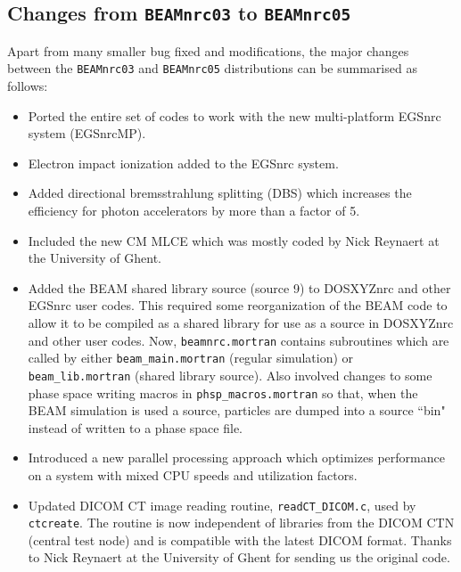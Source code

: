 \documentclass[12pt,twoside]{article}
\begin{document}
\subsection{Changes from {\tt BEAMnrc03} to {\tt BEAMnrc05}}

Apart from many smaller bug fixed and modifications,
the major changes between the {\tt BEAMnrc03} and {\tt BEAMnrc05}
distributions can be summarised as follows:

\begin{itemize}

\item Ported the entire set of codes to work with the new multi-platform
EGSnrc system (EGSnrcMP).

\item Electron impact ionization added to the EGSnrc system.

\item Added directional bremsstrahlung splitting (DBS) which increases the
efficiency for photon accelerators by more than a factor of 5.

\item Included the new CM MLCE which was mostly coded by Nick Reynaert at the
University of Ghent.

\item Added the BEAM shared library source (source 9) to DOSXYZnrc and
other EGSnrc user codes.  This required some reorganization of the
BEAM code to allow it to be compiled as a shared
library for use as a source in DOSXYZnrc and other user codes.  Now,
{\tt beamnrc.mortran} contains subroutines which are called by
either {\tt beam\_main.mortran} (regular simulation) or
{\tt beam\_lib.mortran} (shared library source).  Also involved changes
to some phase space writing macros in {\tt phsp\_macros.mortran} so
that, when the BEAM simulation is used a source, particles are dumped
into a source ``bin" instead of written to a phase space file.

\item Introduced a new parallel processing approach which optimizes
performance on a system with mixed CPU speeds and utilization factors.

\item Updated DICOM CT image reading routine, {\tt readCT\_DICOM.c}, used by
{\tt ctcreate}.  The routine is now independent of libraries from
the DICOM CTN (central test node) and is compatible with the latest
DICOM format.  Thanks to Nick Reynaert at the
University of Ghent for sending us the original
code.


\end{itemize}
\end{document}
